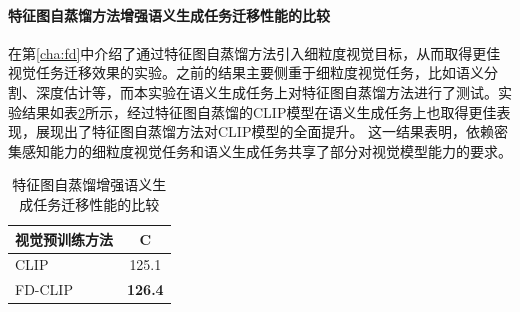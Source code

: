 \begin{table}
\begin{tabular}{lcccccc}
    \bottomrule
  \end{tabular}
  \label{tab:ddcap-compsota}
\end{table}


\paragraph{特征图自蒸馏方法增强语义生成任务迁移性能的比较} 在第\ref{cha:fd}中介绍了通过特征图自蒸馏方法引入细粒度视觉目标，从而取得更佳视觉任务迁移效果的实验。之前的结果主要侧重于细粒度视觉任务，比如语义分割、深度估计等，而本实验在语义生成任务上对特征图自蒸馏方法进行了测试。实验结果如表\ref{tab:ddcap-fd-clip}所示，经过特征图自蒸馏的CLIP模型在语义生成任务上也取得更佳表现，展现出了特征图自蒸馏方法对CLIP模型的全面提升。
这一结果表明，依赖密集感知能力的细粒度视觉任务和语义生成任务共享了部分对视觉模型能力的要求。

\begin{table}
  \centering
  \caption{特征图自蒸馏增强语义生成任务迁移性能的比较}
  \begin{tabular}{lc}
    \toprule
    视觉预训练方法  & C\\
    \midrule
    CLIP & 125.1 \\
    FD-CLIP & \textbf{126.4} \\
    \bottomrule
  \end{tabular}
  \label{tab:ddcap-fd-clip}
\end{table}
